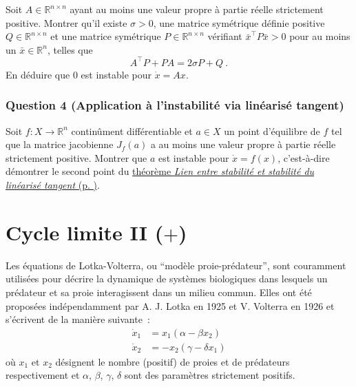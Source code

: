 Soit \(A\in \mathbb{R}^{n\times n}\) ayant au moins une valeur propre à
partie réelle strictement positive. Montrer qu'il existe \(\sigma>0\),
une matrice symétrique définie positive \(Q\in \mathbb{R}^{n\times n}\)
et une matrice symétrique \(P\in \mathbb{R}^{n\times n}\) vérifiant
\(\bar{x}^\top P \bar{x}>0\) pour au moins un \(\bar{x}\in\mathbb{R}^n\),
telles que \[
A^\top P + PA = 2\sigma P + Q \ .
\] En déduire que \(0\) est instable pour
\(\dot{x}=Ax\).

\hypertarget{instab-4}{%
\subsubsection*{Question 4 (Application à l'instabilité via linéarisé
tangent)}\label{instab-4}}


Soit \(f:X \to \mathbb{R}^n\) continûment différentiable et \(a\in X\)
un point d'équilibre de \(f\) tel que la matrice jacobienne \(J_f(a)\) a
au moins une valeur propre à partie réelle strictement positive. Montrer
que \(a\) est instable pour \(\dot x = f(x)\), c'est-à-dire démontrer le
second point du \protect\hyperlink{theo_linTangent}{théorème \emph{Lien
entre stabilité et stabilité du linéarisé tangent} (p.
\pageref*{theo_linTangent})}.

\hypertarget{exo_cycle-lim-volterra}{%
\section{\texorpdfstring{Cycle limite II
(\(+\))}{Cycle limite II (+)}}\label{exo_cycle-lim-volterra}}

Les équations de Lotka-Volterra, ou ``modèle proie-prédateur'', sont
couramment utilisées pour décrire la dynamique de systèmes biologiques
dans lesquels un prédateur et sa proie interagissent dans un milieu
commun. Elles ont été proposées indépendamment par A. J. Lotka en 1925
et V. Volterra en 1926 et s'écrivent de la manière suivante~:
\begin{align*}
\dot{x}_1 &= x_1(\alpha -\beta x_2) \\
\dot{x}_2 &= -x_2(\gamma - \delta x_1)
\end{align*} où \(x_1\) et \(x_2\) désignent le nombre (positif) de
proies et de prédateurs respectivement et \(\alpha\), \(\beta\),
\(\gamma\), \(\delta\) sont des paramètres strictement positifs.

